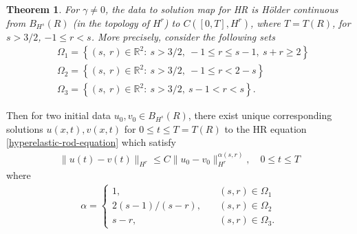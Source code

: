 \documentclass[12pt,reqno]{amsart}
\numberwithin{equation}{section}  %
\numberwithin{figure}{section}
\newcommand{\rr}{\mathbb{R}}
\newtheorem{theorem}{Theorem}[section]
\begin{document}
\begin{theorem}
For $\gamma \neq 0$, the
data to solution map for HR is H\"older continuous from $B_{H^{s}}(R)$ (in
the topology of $H^{r}$) to $C([0, T], H^{r})$, where $T = T(R)$, for $s >
3/2$, $-1 \le r < s$. More
precisely, consider the following sets 
%
  \begin{equation*}
  \begin{split}
      & \Omega_{1} = \left\{ (s, \ r) \in \rr^{2}:
     \ s>3/2, \ -1 \le r \le s-1, \ s + r \ge 2  \right\}
    \\
    & \Omega_{2} = \left\{ (s, \ r) \in \rr^{2}:
     \ s>3/2, \ -1 \le r < 2-s \right\}
    \\
    & \Omega_{3} = \left\{ (s, \ r) \in \rr^{2}:
    \  s>3/2, \  s-1 < r < s  \right\}.
    \end{split}
\end{equation*}
\label{thm:main-thm}
\end{theorem}
%
\begin{center}
\end{center}
%
%
Then for two initial data $u_{0}, v_{0} \in B_{H^{s}}(R)$, there exist unique
corresponding solutions $u(x,t), v(x,t)$ for $0 \le t \le T= T(R)$ to the
HR equation \eqref{hyperelastic-rod-equation} which satisfy 
%
%
\begin{equation*}
\begin{split}
  \| u(t) - v(t) \|_{H^{r}} \le C \| u_{0} - v_{0} \|_{H^{r}}^{\alpha(s, r)},
  \quad 0
  \le t \le T
\end{split}
\end{equation*}
%
%
where 
%
%
\begin{equation*}
\begin{split}
\alpha = 
\begin{cases}
   1, \quad & (s,r) \in \Omega_{1} 
  \\
   2(s-1)/(s-r),  \quad & (s, r) \in \Omega_{2}
  \\
   s-r, \quad & (s, r) \in \Omega_{3}.
\end{cases}
\end{split}
\end{equation*}
%
\end{document}
